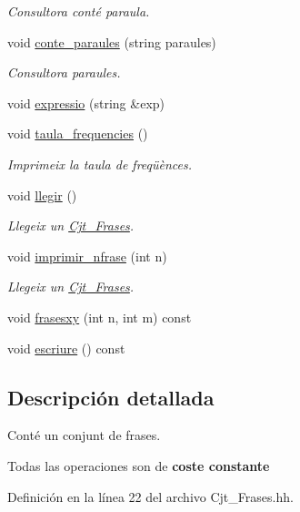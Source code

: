 \begin{DoxyCompactItemize}
\begin{DoxyCompactList}\small\item\em Consultora conté paraula. \end{DoxyCompactList}\item 
void \hyperlink{class_cjt___frases_a14b7023a8d6db200f472c4b24d28ceed}{conte\+\_\+paraules} (string paraules)
\begin{DoxyCompactList}\small\item\em Consultora paraules. \end{DoxyCompactList}\item 
void \hyperlink{class_cjt___frases_a8ea119b6b227b4a00b2084f92f1c2ae2}{expressio} (string \&exp)
\item 
void \hyperlink{class_cjt___frases_a82810909fda7a0dfa200c595ef57033f}{taula\+\_\+frequencies} ()
\begin{DoxyCompactList}\small\item\em Imprimeix la taula de freqüènces. \end{DoxyCompactList}\item 
void \hyperlink{class_cjt___frases_aedcac1f588f4985043b7fb85087b7c71}{llegir} ()
\begin{DoxyCompactList}\small\item\em Llegeix un \hyperlink{class_cjt___frases}{Cjt\+\_\+\+Frases}. \end{DoxyCompactList}\item 
void \hyperlink{class_cjt___frases_a487b50527aa63fd84f3865712fe694fd}{imprimir\+\_\+nfrase} (int n)
\begin{DoxyCompactList}\small\item\em Llegeix un \hyperlink{class_cjt___frases}{Cjt\+\_\+\+Frases}. \end{DoxyCompactList}\item 
void \hyperlink{class_cjt___frases_adfd3891b0aab6ad19c33c0cfd85fe811}{frasesxy} (int n, int m) const 
\item 
void \hyperlink{class_cjt___frases_ada8ea95fd9039d2c0d00fd12731f9932}{escriure} () const 
\end{DoxyCompactItemize}


\subsection{Descripción detallada}
Conté un conjunt de frases. 

Todas las operaciones son de {\bfseries coste constante} 

Definición en la línea 22 del archivo Cjt\+\_\+\+Frases.\+hh.



